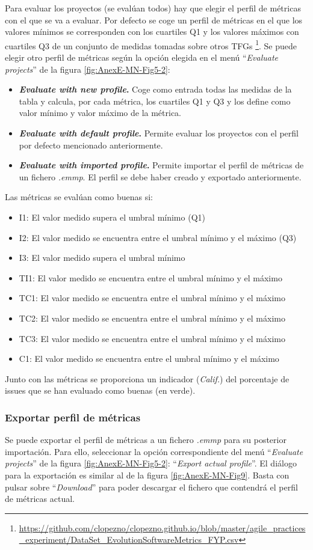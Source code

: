 Para evaluar los proyectos (se evalúan todos) hay que elegir el perfil de métricas con el que se va a evaluar. Por defecto se coge un perfil de métricas en el que los valores mínimos se corresponden con los cuartiles Q1 y los valores máximos con cuartiles Q3 de un conjunto de medidas tomadas sobre otros TFGs \footnote{\url{https://github.com/clopezno/clopezno.github.io/blob/master/agile_practices_experiment/DataSet_EvolutionSoftwareMetrics_FYP.csv}}\cite{lopez_portal_2019}. Se puede elegir otro perfil de métricas según la opción elegida en el menú ``\textit{Evaluate projects}'' de la figura \ref{fig:AnexE-MN-Fig5-2}:
\begin{itemize}
	\item \textbf{\textit{Evaluate with new profile}.} Coge como entrada todas las medidas de la tabla y calcula, por cada métrica, los cuartiles Q1 y Q3 y los define como valor mínimo y valor máximo de la métrica.
	\item \textbf{\textit{Evaluate with default profile}.} Permite evaluar los proyectos con el perfil por defecto mencionado anteriormente.
	\item \textbf{\textit{Evaluate with imported profile}.} Permite importar el perfil de métricas de un fichero \textit{.emmp}. El perfil se debe haber creado y exportado anteriormente.
\end{itemize}

Las métricas se evalúan como buenas si:
\begin{itemize}
	\item I1: El valor medido supera el umbral mínimo (Q1)
	\item I2: El valor medido se encuentra entre el umbral mínimo y el máximo (Q3)
	\item I3: El valor medido supera el umbral mínimo
	\item TI1: El valor medido se encuentra entre el umbral mínimo y el máximo
	\item TC1: El valor medido se encuentra entre el umbral mínimo y el máximo
	\item TC2: El valor medido se encuentra entre el umbral mínimo y el máximo
	\item TC3: El valor medido se encuentra entre el umbral mínimo y el máximo
	\item C1: El valor medido se encuentra entre el umbral mínimo y el máximo
\end{itemize}

Junto con las métricas se proporciona un indicador (\textit{Calif.}) del porcentaje de issues que se han evaluado como buenas (en verde).

\subsubsection{Exportar perfil de métricas}
Se puede exportar el perfil de métricas a un fichero \textit{.emmp} para su posterior importación. Para ello, seleccionar la opción correspondiente del menú ``\textit{Evaluate projects}'' de la figura \ref{fig:AnexE-MN-Fig5-2}: ``\textit{Export actual profile}''. El diálogo para la exportación es similar al de la figura \ref{fig:AnexE-MN-Fig9}. Basta con pulsar sobre ``\textit{Download}'' para poder descargar el fichero que contendrá el perfil de métricas actual.